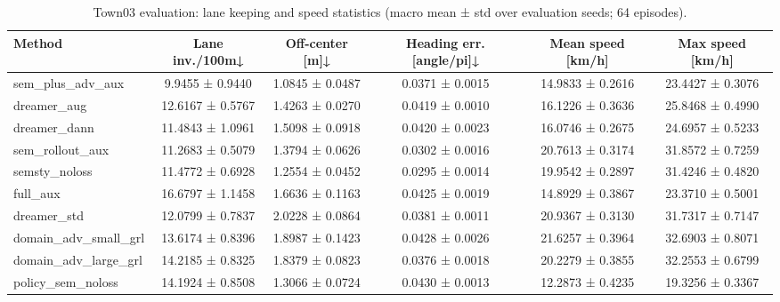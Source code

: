 \begin{table}
\caption{Town03 evaluation: lane keeping and speed statistics (macro mean ± std over evaluation seeds; 64 episodes).}
\label{tab:town03_lane_speed}
\begin{tabular}{lccccc}
\toprule
Method & Lane inv./100m↓ & Off-center [m]↓ & Heading err. [angle/pi]↓ & Mean speed [km/h] & Max speed [km/h] \\
\midrule
sem_plus_adv_aux & 9.9455 ± 0.9440 & 1.0845 ± 0.0487 & 0.0371 ± 0.0015 & 14.9833 ± 0.2616 & 23.4427 ± 0.3076 \\
dreamer_aug & 12.6167 ± 0.5767 & 1.4263 ± 0.0270 & 0.0419 ± 0.0010 & 16.1226 ± 0.3636 & 25.8468 ± 0.4990 \\
dreamer_dann & 11.4843 ± 1.0961 & 1.5098 ± 0.0918 & 0.0420 ± 0.0023 & 16.0746 ± 0.2675 & 24.6957 ± 0.5233 \\
sem_rollout_aux & 11.2683 ± 0.5079 & 1.3794 ± 0.0626 & 0.0302 ± 0.0016 & 20.7613 ± 0.3174 & 31.8572 ± 0.7259 \\
semsty_noloss & 11.4772 ± 0.6928 & 1.2554 ± 0.0452 & 0.0295 ± 0.0014 & 19.9542 ± 0.2897 & 31.4246 ± 0.4820 \\
full_aux & 16.6797 ± 1.1458 & 1.6636 ± 0.1163 & 0.0425 ± 0.0019 & 14.8929 ± 0.3867 & 23.3710 ± 0.5001 \\
dreamer_std & 12.0799 ± 0.7837 & 2.0228 ± 0.0864 & 0.0381 ± 0.0011 & 20.9367 ± 0.3130 & 31.7317 ± 0.7147 \\
domain_adv_small_grl & 13.6174 ± 0.8396 & 1.8987 ± 0.1423 & 0.0428 ± 0.0026 & 21.6257 ± 0.3964 & 32.6903 ± 0.8071 \\
domain_adv_large_grl & 14.2185 ± 0.8325 & 1.8379 ± 0.0823 & 0.0376 ± 0.0018 & 20.2279 ± 0.3855 & 32.2553 ± 0.6799 \\
policy_sem_noloss & 14.1924 ± 0.8508 & 1.3066 ± 0.0724 & 0.0430 ± 0.0013 & 12.2873 ± 0.4235 & 19.3256 ± 0.3367 \\
\bottomrule
\end{tabular}
\end{table}
